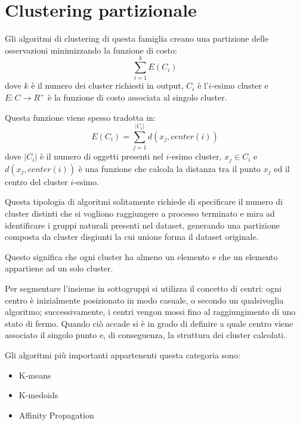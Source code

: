 \section{Clustering partizionale}
	Gli algoritmi di clustering di questa famiglia creano una partizione delle osservazioni minimizzando la funzione di costo:
	\begin{equation*}
	  \sum_{i=1}^{k}{E(C_i)}
	\end{equation*}
	dove $k$ è il numero dei cluster richiesti in output, $C_i$ è l'$i$-esimo cluster e $E:C \rightarrow R^{+}$ è la funzione di costo associata al singolo cluster.

	Questa funzione viene spesso tradotta in\cite{funzione_costo}:
	\begin{equation*}
	  	E(C_i) = \sum_{j=1}^{|C_i|}{d(x_j, center(i))}
	\end{equation*}
	dove $|C_i|$ è il numero di oggetti presenti nel $i$-esimo cluster, $x_j \in C_i$  e $d(x_j, center(i))$ è una funzione che calcola la distanza tra il punto $x_j$ ed il centro del cluster $i$-esimo.

	Questa tipologia di algoritmi solitamente richiede di specificare il numero di cluster distinti che si vogliono raggiungere a processo terminato e mira ad identificare i gruppi naturali presenti nel dataset, generando una partizione composta da cluster disgiunti la cui unione forma il dataset originale.

	Questo significa che ogni cluster ha almeno un elemento e che un elemento appartiene ad un solo cluster.

	Per segmentare l'insieme in sottogruppi si utilizza il concetto di centri: ogni centro è inizialmente posizionato in modo casuale, o secondo un qualsivoglia algoritmo; successivamente, i centri vengon mossi fino al raggiungimento di uno stato di fermo. Quando ciò accade si è in grado di definire a quale centro viene associato il singolo punto e, di conseguenza, la struttura dei cluster calcolati. 

	Gli algoritmi più importanti appartenenti questa categoria sono: 
	\begin{itemize}
	  	\item K-means
	  	\item K-medoids
	  	\item Affinity Propagation
	\end{itemize}
